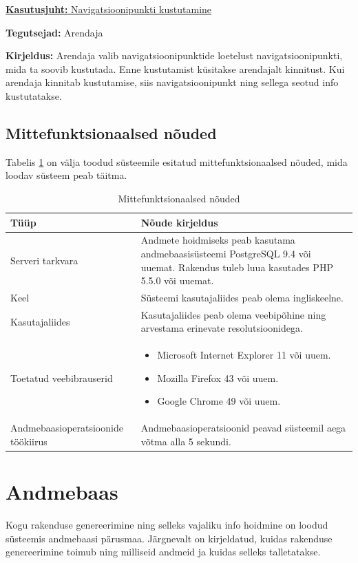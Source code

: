 \documentclass[a4paper,12pt]{article} %
\begin{document}
\underline{\textbf{Kasutusjuht:} Navigatsioonipunkti kustutamine}
\par
\textbf{Tegutsejad:} Arendaja
\par
\textbf{Kirjeldus:} Arendaja valib navigatsioonipunktide loetelust navigatsioonipunkti, mida ta soovib kustutada. Enne kustutamist küsitakse arendajalt kinnitust. Kui arendaja kinnitab kustutamise, siis navigatsioonipunkt ning sellega seotud info kustutatakse.
\par

\subsection{Mittefunktsionaalsed nõuded}
Tabelis \ref{mittefunktsionaalsed_nõuded} on välja toodud süsteemile esitatud mittefunktsionaalsed nõuded, mida loodav süsteem peab täitma.
\begin{table}[H]%
\begin{center}
\caption{Mittefunktsionaalsed nõuded}
\label{mittefunktsionaalsed_nõuded}
\begin{tabular}{|p{5cm}|p{10cm}|}
\hline
\rowcolor{rowgray}
Tüüp & Nõude kirjeldus \\ \hline
Serveri tarkvara & Andmete hoidmiseks peab kasutama andmebaasisüsteemi PostgreSQL 9.4 või uuemat. Rakendus tuleb luua kasutades PHP 5.5.0 või uuemat. \\ \hline
Keel & Süsteemi kasutajaliides peab olema ingliskeelne. \\ \hline
Kasutajaliides & Kasutajaliides peab olema veebipõhine ning arvestama erinevate resolutsioonidega. \\ \hline
Toetatud veebibrauserid & 
\begin{itemize}
\item Microsoft Internet Explorer 11 või uuem.
\item Mozilla Firefox 43 või uuem.
\item Google Chrome 49 või uuem.
\end{itemize}
 \\ \hline
Andmebaasioperatsioonide töökiirus & Andmebaasioperatsioonid peavad süsteemil aega võtma alla 5 sekundi. \\ \hline
\end{tabular}
\end{center}
\end{table}

\section{Andmebaas}
Kogu rakenduse genereerimine ning selleks vajaliku info hoidmine on loodud süsteemis andmebaasi pärusmaa. Järgnevalt on kirjeldatud, kuidas rakenduse genereerimine toimub ning milliseid andmeid ja kuidas selleks talletatakse.
\end{document}
